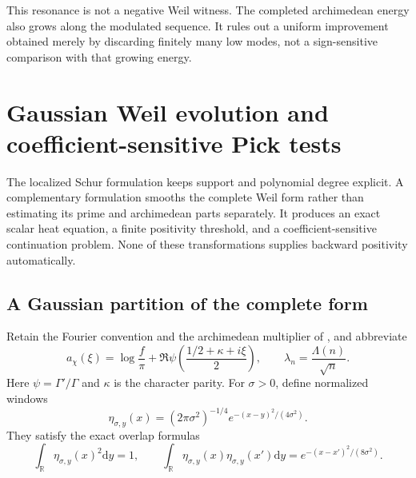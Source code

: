 \documentclass[11pt]{article}
\theoremstyle{definition}
\theoremstyle{remark}
\newcommand{\R}{\mathbb R}
\newcommand{\dd}{\mathrm d}
\begin{document}
This resonance is not a negative Weil witness.  The completed
archimedean energy also grows along the modulated sequence.  It rules
out a uniform improvement obtained merely by discarding finitely many
low modes, not a sign-sensitive comparison with that growing energy.


\section{Gaussian Weil evolution and coefficient-sensitive Pick tests}
\label{sec:gaussian-weil-pick}

The localized Schur formulation keeps support and polynomial degree
explicit.  A complementary formulation smooths the complete Weil form
rather than estimating its prime and archimedean parts separately.
It produces an exact scalar heat equation, a finite positivity
threshold, and a coefficient-sensitive continuation problem.  None of
these transformations supplies backward positivity automatically.

\subsection{A Gaussian partition of the complete form}

Retain the Fourier convention and the archimedean multiplier of
, and abbreviate
\begin{equation}
 a_\chi(\xi)=\log\frac f\pi+
 \Re\psi\!\left(\frac{1/2+\kappa+i\xi}{2}\right),
 \qquad \lambda_n=\frac{\Lambda(n)}{\sqrt n}.
 \label{eq:gauss-arch-symbol}
\end{equation}
Here $\psi=\Gamma'/\Gamma$ and $\kappa$ is the character parity.
For $\sigma>0$, define normalized windows
\begin{equation}
 \eta_{\sigma,y}(x)=(2\pi\sigma^2)^{-1/4}
                 e^{-(x-y)^2/(4\sigma^2)}.
 \label{eq:gauss-window}
\end{equation}
They satisfy the exact overlap formulas
\begin{equation}
 \int_\R\eta_{\sigma,y}(x)^2\dd y=1,\qquad
 \int_\R\eta_{\sigma,y}(x)\eta_{\sigma,y}(x')\dd y
 =e^{-(x-x')^2/(8\sigma^2)}.
 \label{eq:gauss-overlap}
\end{equation}
\end{document}
